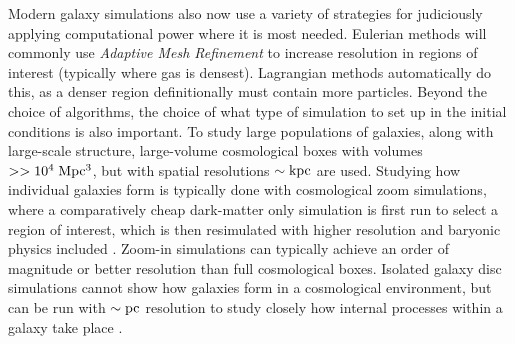 Modern galaxy simulations also now use a variety of strategies for judiciously
applying computational power where it is most needed.  Eulerian methods will
commonly use \textit{Adaptive Mesh Refinement} to increase resolution in regions
of interest (typically where gas is densest).  Lagrangian methods automatically
do this, as a denser region definitionally must contain more particles.  Beyond
the choice of algorithms, the choice of what type of simulation to set up in the
initial conditions is also important.  To study large populations of galaxies,
along with large-scale structure, large-volume cosmological boxes with volumes
$>>10^4\;\rm{Mpc^3}$, but with spatial resolutions $\sim \rm{kpc}$ are used.
Studying how individual galaxies form is typically done with cosmological zoom
simulations, where a comparatively cheap dark-matter only simulation is first
run to select a region of interest, which is then resimulated with higher
resolution and baryonic physics included \citep{Quinn1992}. Zoom-in simulations
can typically achieve an order of magnitude or better resolution than full
cosmological boxes.  Isolated galaxy disc simulations cannot show how galaxies
form in a cosmological environment, but can be run with $\sim \rm{pc}$
resolution to study closely how internal processes within a galaxy take place
\citep{Hopkins2011,Benincasa2015}.

